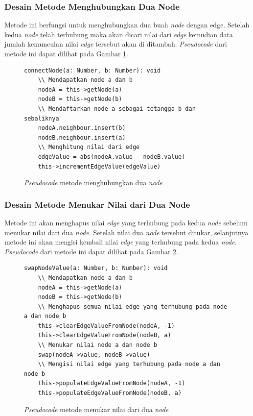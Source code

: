 \subsubsection{Desain Metode Menghubungkan Dua Node}
Metode ini berfungsi untuk menghubungkan dua buah \textit{node} dengan edge. Setelah kedua \textit{node} telah terhubung maka akan dicari nilai dari \textit{edge} kemudian data jumlah kemunculan nilai \textit{edge} tersebut akan di ditambah. \textit{Pseudocode} dari metode ini dapat dilihat pada Gambar \ref{psdo:tree_connectNodes}.

\begin{figure}[ht]
	\begin{lstlisting}[firstnumber=0]
	connectNode(a: Number, b: Number): void
	\\ Mendapatkan node a dan b
	nodeA = this->getNode(a)
	nodeB = this->getNode(b)
	\\ Mendaftarkan node a sebagai tetangga b dan sebaliknya
	nodeA.neighbour.insert(b)
	nodeB.neighbour.insert(a)
	\\ Menghitung nilai dari edge
	edgeValue = abs(nodeA.value - nodeB.value)
	this->incrementEdgeValue(edgeValue)
	\end{lstlisting}
	\caption{\textit{Pseudocode} metode menghubungkan dua \textit{node}}
	\label{psdo:tree_connectNodes}
\end{figure}

\subsubsection{Desain Metode Menukar Nilai dari Dua Node}
Metode ini akan menghapus nilai \textit{edge} yang terhubung pada kedua \textit{node} sebelum menukar nilai dari dua \textit{node}. Setelah nilai dua \textit{node} tersebut ditukar, selanjutnya metode ini akan mengisi kembali nilai \textit{edge} yang terhubung pada kedua \textit{node}. \textit{Pseudocode} dari metode ini dapat dilihat pada Gambar \ref{psdo:tree_swapNodeValue}.

\begin{figure}[ht]
	\begin{lstlisting}[firstnumber=0]
	swapNodeValue(a: Number, b: Number): void
	\\ Mendapatkan node a dan b
	nodeA = this->getNode(a)
	nodeB = this->getNode(b)
	\\ Menghapus semua nilai edge yang terhubung pada node a dan node b
	this->clearEdgeValueFromNode(nodeA, -1)
	this->clearEdgeValueFromNode(nodeB, a)
	\\ Menukar nilai node a dan node b
	swap(nodeA->value, nodeB->value)
	\\ Mengisi nilai edge yang terhubung pada node a dan node b
	this->populateEdgeValueFromNode(nodeA, -1)
	this->populateEdgeValueFromNode(nodeB, a)
	\end{lstlisting}
	\caption{\textit{Pseudocode} metode menukar nilai dari dua \textit{node}}
	\label{psdo:tree_swapNodeValue}
\end{figure}

